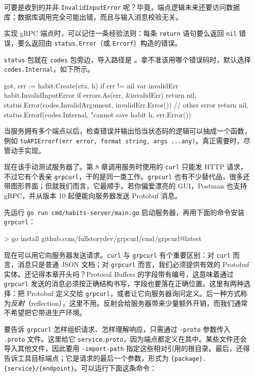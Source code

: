 可要是收到的并非 \texttt{InvalidInputError} 呢？毕竟，端点逻辑未来还要访问数据库；数据库调用完全可能出错，而且与输入消息校验无关。

实现 gRPC 端点时，可以记住一条经验法则：每条 \texttt{return} 语句要么返回 \texttt{nil} 错误，要么返回由 \texttt{status.Error}（或 \texttt{Errorf}）构造的错误。

\texttt{status} 包就在 \texttt{codes} 包旁边，导入路径是 。拿不准该用哪个错误码时，默认选择 \texttt{codes.Internal}，如下所示。

\begin{gocode}[title={代码清单 10.18 \texttt{create.go}：处理错误}]
got, err := habit.Create(ctx, h)
if err != nil {
    var invalidErr habit.InvalidInputError
    if errors.As(err, &invalidErr) {
        return nil, status.Error(codes.InvalidArgument, invalidErr.Error())
    }
    // other error
    return nil, status.Errorf(codes.Internal, "cannot save habit %
        h, err.Error())
}
\end{gocode}

当服务拥有多个端点以后，检查错误并输出恰当状态码的逻辑可以抽成一个函数，例如 \texttt{toAPIErrorf(err error, format string, args ...any)}。真正需要时，尽管动手实现。

现在该手动测试服务器了。第 8 章调用服务时使用的 \texttt{curl} 只能发 HTTP 请求，不过它有个表亲 \texttt{grpcurl}，干的是同一类工作。\texttt{grpcurl} 也有不少替代品，很多还带图形界面；但就我们而言，它最顺手。若你偏爱漂亮的 GUI，Postman 也支持 gRPC，并从版本 10 起便能向服务器发送 Protobuf 消息。

先运行 \texttt{go run cmd/habits-server/main.go} 启动服务器，再用下面的命令安装 \texttt{grpcurl}：

\begin{shellcode}[]
> go install github.com/fullstorydev/grpcurl/cmd/grpcurl@latest
\end{shellcode}

现在可以用它向服务器发送请求。\texttt{curl} 与 \texttt{grpcurl} 有个重要区别：对 \texttt{curl} 而言，消息只是普通 JSON 文档；对 \texttt{grpcurl} 而言，我们必须提供有效的 Protobuf 实体。还记得本章开头吗？Protocol Buffers 的字段带有编号，这意味着通过 \texttt{grpcurl} 发送的消息必须按正确结构书写，字段也要落在正确位置。这里有两种选择：把 Protobuf 定义交给 \texttt{grpcurl}，或者让它向服务器询问定义。后一种方式称为\emph{反射}（reflection），这里不用。反射会给服务器带来少量额外开销，而我们通常不希望把它带进生产环境。

要告诉 \texttt{grpcurl} 怎样组织请求、怎样理解响应，只需通过 \texttt{-proto} 参数传入 \texttt{.proto} 文件。这里给它 \texttt{service.proto}，因为端点都定义在其中。某些文件还会导入其他文件，因此要用 \texttt{-import-path} 指定这些相对引用的根目录。最后，还得告诉工具目标端点；它是请求的最后一个参数，形式为 \texttt{\{package\}.\{service\}/\{endpoint\}}。可以运行下面这条命令：

